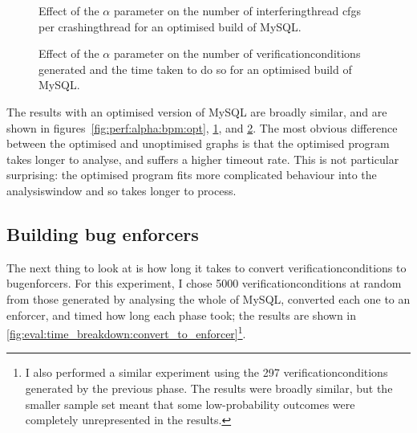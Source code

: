 \begin{figure}
  \caption{Effect of the $\alpha$ parameter on the number of
    \gls{interferingthread} \glspl{cfg} per \gls{crashingthread}
        {\StateMachine} for an optimised build of MySQL.  }
  \label{fig:perf:alpha:gsc:opt}
\end{figure}

\begin{figure}
  \caption{Effect of the $\alpha$ parameter on the number of
    \glspl{verificationcondition} generated and the time taken to do
    so for an optimised build of MySQL.}
  \label{fig:perf:alpha:gvc:opt}
\end{figure}

The results with an optimised version of MySQL are broadly similar,
and are shown in figures~\ref{fig:perf:alpha:bpm:opt},
\ref{fig:perf:alpha:gsc:opt}, and \ref{fig:perf:alpha:gvc:opt}.  The
most obvious difference between the optimised and unoptimised graphs
is that the optimised program takes longer to analyse, and suffers a
higher timeout rate.  This is not particular surprising: the optimised
program fits more complicated behaviour into the \gls{analysiswindow}
and so takes longer to process.  

\subsection{Building bug enforcers}

The next thing to look at is how long it takes to convert
\glspl{verificationcondition} to \glspl{bugenforcer}.  For this
experiment, I chose 5000 \glspl{verificationcondition} at random from
those generated by analysing the whole of MySQL, converted each one to
an enforcer, and timed how long each phase took; the results are shown
in \autoref{fig:eval:time_breakdown:convert_to_enforcer}\footnote{I
  also performed a similar experiment using the 297
  \glspl{verificationcondition} generated by the previous phase.  The
  results were broadly similar, but the smaller sample set meant that
  some low-probability outcomes were completely unrepresented in the
  results.}.

